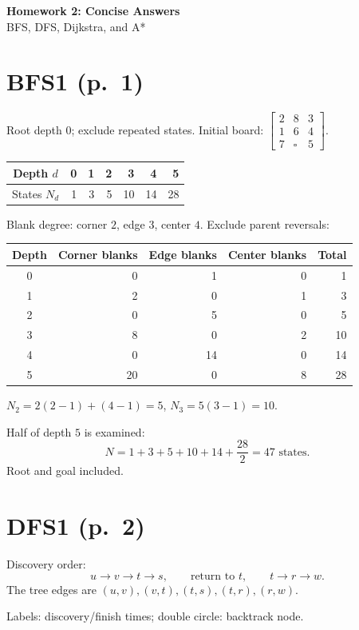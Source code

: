 \documentclass[11pt,a4paper]{article}
\newcommand{\question}[2]{\section*{#1}}
\begin{document}
\begin{center}{\Large\bfseries Homework 2: Concise Answers}\\[4pt]BFS, DFS, Dijkstra, and A*\end{center}

\question{BFS1 (p.\ 1)}{Number of states searched}
Root depth $0$; exclude repeated states. Initial board: $\left[\begin{smallmatrix}2&8&3\\1&6&4\\7&\square&5\end{smallmatrix}\right]$.
\begin{center}\begin{tabular}{c|rrrrrr}\toprule
Depth $d$&0&1&2&3&4&5\\\midrule
States $N_d$&1&3&5&10&14&28\\\bottomrule
\end{tabular}\end{center}
Blank degree: corner $2$, edge $3$, center $4$. Exclude parent reversals:
\begin{center}\begin{tabular}{c|rrr|r}\toprule
Depth&Corner blanks&Edge blanks&Center blanks&Total\\\midrule
0&0&1&0&1\\1&2&0&1&3\\2&0&5&0&5\\3&8&0&2&10\\4&0&14&0&14\\5&20&0&8&28\\\bottomrule\end{tabular}\end{center}
$N_2=2(2-1)+(4-1)=5$, $N_3=5(3-1)=10$.

Half of depth $5$ is examined:
\[
N=1+3+5+10+14+\frac{28}{2}=\boxed{47\text{ states}}.
\]
Root and goal included.

\newpage
\question{DFS1 (p.\ 2)}{Search tree and backtracking}
Discovery order:
\[
u\to v\to t\to s,\qquad\text{return to }t,\qquad t\to r\to w.
\]
The tree edges are $(u,v),(v,t),(t,s),(t,r),(r,w)$.
\begin{center}\end{center}
Labels: discovery/finish times; double circle: backtrack node.
\end{document}
